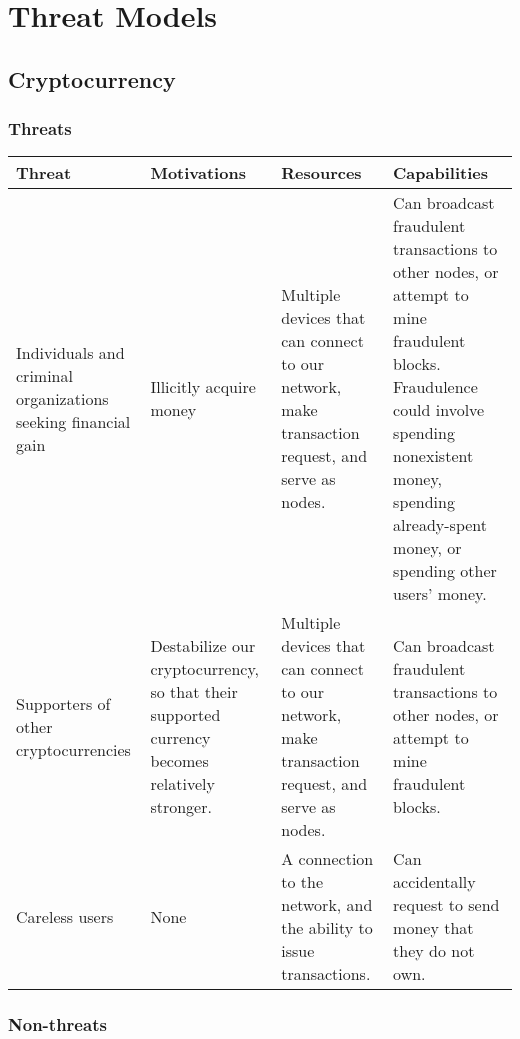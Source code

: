 \documentclass[12pt]{article}
\begin{document}
\section{Threat Models}

\subsection{Cryptocurrency}

\subsubsection*{Threats}

\begin{tabulary}{\linewidth}{|L|L|L|L|}
\hline
\textbf{Threat} & \textbf{Motivations} & \textbf{Resources} & \textbf{Capabilities} \\
\hline
Individuals and criminal organizations seeking financial gain & Illicitly acquire money & Multiple devices that can connect to our network, make transaction request, and serve as nodes. & Can broadcast fraudulent transactions to other nodes, or attempt to mine fraudulent blocks. Fraudulence could involve spending nonexistent money, spending already-spent money, or spending other users' money. \\
\hline
Supporters of other cryptocurrencies & Destabilize our cryptocurrency, so that their supported currency becomes relatively stronger. & Multiple devices that can connect to our network, make transaction request, and serve as nodes. & Can broadcast fraudulent transactions to other nodes, or attempt to mine fraudulent blocks. \\
\hline
Careless users & None & A connection to the network, and the ability to issue transactions. & Can accidentally request to send money that they do not own. \\
\hline
\end{tabulary}

\subsubsection*{Non-threats}
\end{document}
